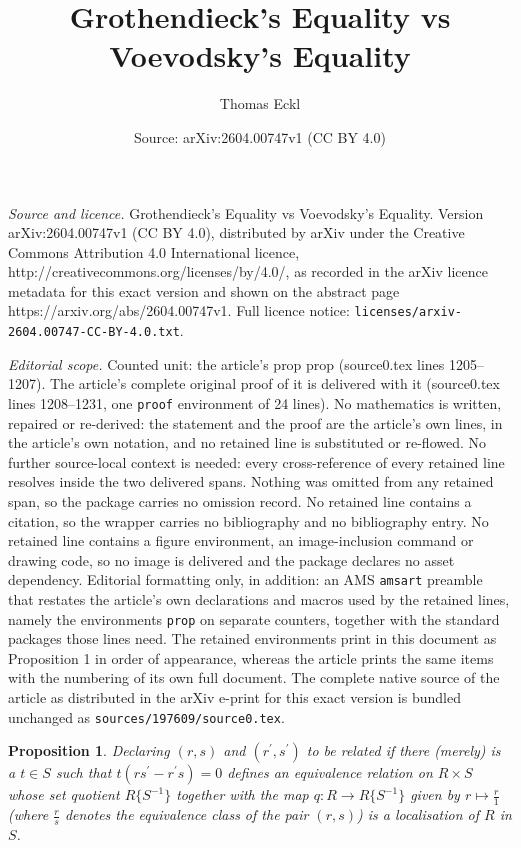 \documentclass[10pt,a4paper]{amsart}
\title{Grothendieck's Equality vs Voevodsky's Equality}
\author{Thomas Eckl}
\date{Source: arXiv:2604.00747v1 (CC BY 4.0)}
\newtheorem{prop}{Proposition}
\begin{document}
\maketitle

\noindent\emph{Source and licence.} Grothendieck's Equality vs Voevodsky's Equality. Version arXiv:2604.00747v1 (CC BY 4.0), distributed by arXiv under the Creative Commons Attribution 4.0 International licence, http://creativecommons.org/licenses/by/4.0/, as recorded in the arXiv licence metadata for this exact version and shown on the abstract page https://arxiv.org/abs/2604.00747v1. Full licence notice: \texttt{licenses/arxiv-2604.00747-CC-BY-4.0.txt}.\par\smallskip

\noindent\textit{Editorial scope.} Counted unit: the article's prop prop (source0.tex lines 1205--1207). The article's complete original proof of it is delivered with it (source0.tex lines 1208--1231, one \texttt{proof} environment of 24 lines). No mathematics is written, repaired or re-derived: the statement and the proof are the article's own lines, in the article's own notation, and no retained line is substituted or re-flowed.  No further source-local context is needed: every cross-reference of every retained line resolves inside the two delivered spans.  Nothing was omitted from any retained span, so the package carries no omission record.  No retained line contains a citation, so the wrapper carries no bibliography and no bibliography entry.  No retained line contains a figure environment, an image-inclusion command or drawing code, so no image is delivered and the package declares no asset dependency.  Editorial formatting only, in addition: an AMS \texttt{amsart} preamble that restates the article's own declarations and macros used by the retained lines, namely the environments \texttt{prop} on separate counters, together with the standard packages those lines need.  The retained environments print in this document as Proposition 1 in order of appearance, whereas the article prints the same items with the numbering of its own full document.  The complete native source of the article as distributed in the arXiv e-print for this exact version is bundled unchanged as \texttt{sources/197609/source0.tex}.
\begin{prop}
Declaring $(r, s)$ and $(r^\prime, s^\prime)$ to be related if there (merely) is a $t \in S$ such that $t(rs^\prime - r^\prime s) = 0$ defines an equivalence relation on $R \times S$ whose set quotient $R\{S^{-1}\}$ together with the map $q : R \rightarrow R\{S^{-1}\}$ given by $r \mapsto \frac{r}{1}$ (where $\frac{r}{s}$ denotes the equivalence class of the pair $(r,s)$) is a localisation of $R$ in $S$.
\end{prop}
\end{document}
